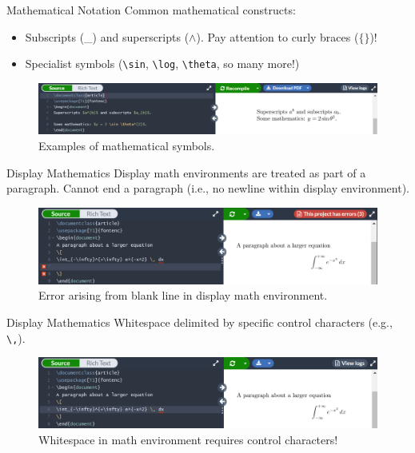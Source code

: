 \documentclass{beamer}
\begin{document}
{  \begin{frame}{Mathematical Notation}
    Common mathematical constructs:
    \begin{itemize}
      \item Subscripts (\_) and superscripts ($\wedge$). Pay attention to curly braces ($\{\}$)!
      \item Specialist symbols (\texttt{\textbackslash sin}, \texttt{\textbackslash log}, \texttt{\textbackslash theta}, so many more!)
    \end{itemize}
    \begin{figure}
      \includegraphics[width=1.0\linewidth]{day02-01B-symbols.png}
      \caption{Examples of mathematical symbols.}
      \label{fig:day02-01B}
    \end{figure}
  \end{frame}

  \begin{frame}{Display Mathematics}
    Display math environments are treated as part of a paragraph. Cannot end a paragraph (i.e., no newline within display environment).
    \begin{figure}
      \includegraphics[width=1.0\linewidth]{day02-01C-error.png}
      \caption{Error arising from blank line in display math environment.}
      \label{fig:day02-01C}
    \end{figure}
  \end{frame}

  \begin{frame}{Display Mathematics}
    Whitespace delimited by specific control characters (e.g., \texttt{\textbackslash ,}).
    \begin{figure}
      \includegraphics[width=1.0\linewidth]{day02-01D-whitespace.png}
      \caption{Whitespace in math environment requires control characters!}
      \label{fig:day02-01D}
    \end{figure}
  \end{frame}

}
\end{document}
